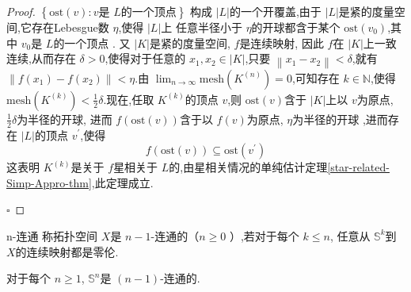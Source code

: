 \documentclass[../../几何与拓扑.tex]{subfiles}
\begin{document}
\begin{proof}
     \(  \left\{ \mathrm{ost}\left( v \right): v\text{是 } L \text{的一个顶点}  \right\}  \) 构成 \(  \left| L \right|   \)的一个开覆盖,由于 \(  \left| L \right|   \)是紧的度量空间,它存在Lebesgue数 \(  \eta   \),使得 \(  \left| L \right|   \)上 任意半径小于 \(  \eta   \)的开球都含于某个 \(  \mathrm{ost}\left( v_0 \right)   \),其中 \(  v_0  \)是 \(  L  \)的一个顶点   .
     又 \(  \left| K \right|   \)是紧的度量空间, \(  f  \)是连续映射,    因此 \(  f  \)在 \(  \left| K \right|   \)上一致连续,从而存在 \(  \delta >0  \),使得对于任意的 \(  x_1,x_2 \in \left| K \right|   \),只要
      \(  \left\| x_1-x_2 \right\|<  \delta   \),就有 \(  \left\| f\left( x_1 \right)-f\left( x_2 \right)   \right\|< \eta   \).由 \(  \lim_{n \to \infty} \mathrm{mesh}\left( K^{\left( n \right) } \right)= 0   \),可知存在 \(  k \in \mathbb{N}   \),使得
       \(  \mathrm{mesh}\left( K^{\left( k \right) } \right)< \frac{1}{2}  \delta     \).现在,任取 \(  K^{\left( k \right) }  \)的顶点 \(  v  \),则 \(  \mathrm{ost}\left( v \right)   \)含于 \( \left| K \right|   \)上以 \(  v  \)为原点, \(  \frac{1}{2}  \delta    \)为半径的开球,
       进而 \(  f\left( \mathrm{ost}\left( v \right)  \right)   \)含于以 \(  f\left( v \right)   \)为原点, \(  \eta   \)为半径的开球 ,进而存在 \(  \left| L \right|   \)的顶点 \(  v^{\prime}   \),使得 \[
       f\left( \mathrm{ost}\left( v \right)  \right)\subseteq \mathrm{ost}\left( v^{\prime}  \right)  
       \]这表明 \(  K^{\left( k \right) } \)是关于 \(  f  \)星相关于 \(  L  \)的,由星相关情况的单纯估计定理\ref{star-related-Simp-Appro-thm},此定理成立.           
      

    \hfill $\square$
\end{proof}


\begin{definition}{n-连通}
    称拓扑空间 \(  X  \)是 \(  n -1 \)-连通的（\(n\ge 0  \)   ）,若对于每个 \(  k\le n  \), 任意从 \(  \mathbb{S}^{k}  \)到 \(  X  \)的连续映射都是零伦.   
\end{definition}

\begin{theorem}
    对于每个 \(  n\ge 1  \), \(  \mathbb{S}^{n}  \)是 \(  \left( n-1 \right)   \)-连通的.   
\end{theorem}
\end{document}
